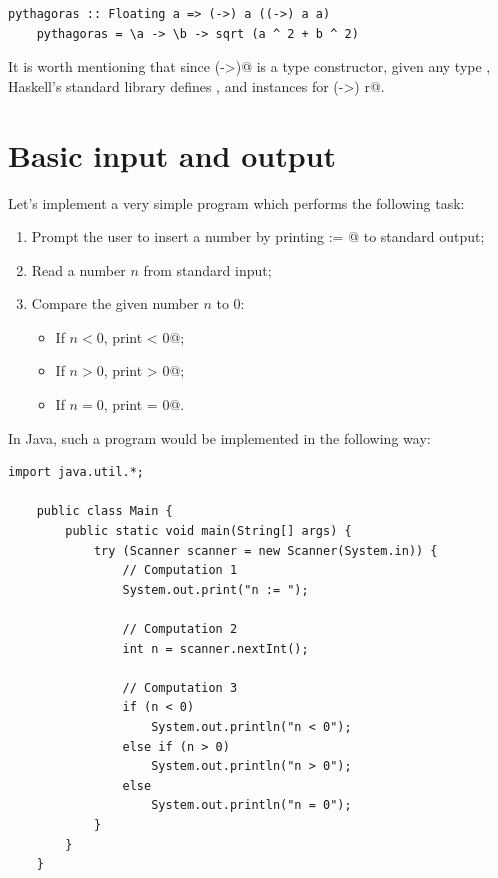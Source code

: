 \documentclass[UdineBachThesis,american,11pt]{PhdThesis}
\begin{document}
  \begin{lstlisting}[gobble=4,basicstyle=\ttfamily\small]
    pythagoras :: Floating a => (->) a ((->) a a)
    pythagoras = \a -> \b -> sqrt (a ^ 2 + b ^ 2)
  \end{lstlisting}

  It is worth mentioning that since \lstinline@(->)@ is a type constructor,
  given any type \lstinline@r@, Haskell's standard library defines
  \lstinline@Functor@, \lstinline@Applicative@ and \lstinline@Monad@ instances
  for \lstinline@(->) r@.

  \newpage

  \section{Basic input and output}

  Let's implement a very simple program which performs the following task:

  \begin{enumerate}
    \item Prompt the user to insert a number by printing \lstinline@n := @ to
    standard output;

    \item Read a number $n$ from standard input;

    \item Compare the given number $n$ to $0$:

    \begin{itemize}[noitemsep]
      \item If $n < 0$, print \lstinline@n < 0@;
      \item If $n > 0$, print \lstinline@n > 0@;
      \item If $n = 0$, print \lstinline@n = 0@.
    \end{itemize}
  \end{enumerate}

  In Java, such a program would be implemented in the following way:

  \begin{lstlisting}[gobble=4,basicstyle=\ttfamily\small]
    import java.util.*;

    public class Main {
        public static void main(String[] args) {
            try (Scanner scanner = new Scanner(System.in)) {
                // Computation 1
                System.out.print("n := ");

                // Computation 2
                int n = scanner.nextInt();

                // Computation 3
                if (n < 0)
                    System.out.println("n < 0");
                else if (n > 0)
                    System.out.println("n > 0");
                else
                    System.out.println("n = 0");
            }
        }
    }
  \end{lstlisting}
\end{document}

